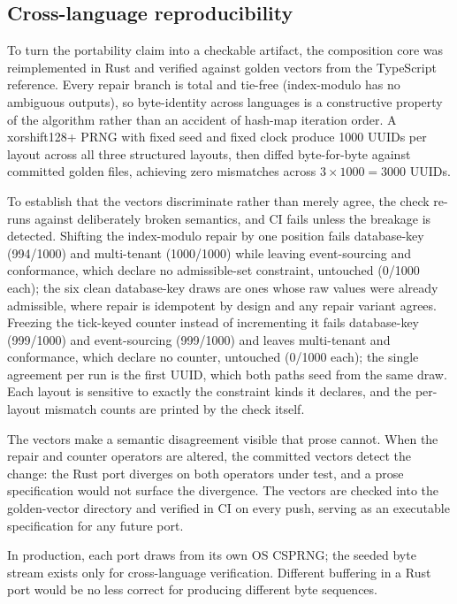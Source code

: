 \documentclass{svproc}
\begin{document}
\subsection{Cross-language reproducibility}
\label{sec:cross-lang}

To turn the portability claim into a checkable artifact, the composition core was reimplemented in Rust and verified against golden vectors from the TypeScript reference. Every repair branch is total and tie-free (index-modulo has no ambiguous outputs), so byte-identity across languages is a constructive property of the algorithm rather than an accident of hash-map iteration order. A xorshift128+ PRNG with fixed seed and fixed clock produce 1000 UUIDs per layout across all three structured layouts, then diffed byte-for-byte against committed golden files, achieving zero mismatches across $3\times1000=3000$ UUIDs.

To establish that the vectors discriminate rather than merely agree, the check re-runs against deliberately broken semantics, and CI fails unless the breakage is detected. Shifting the index-modulo repair by one position fails database-key (994/1000) and multi-tenant (1000/1000) while leaving event-sourcing and conformance, which declare no admissible-set constraint, untouched (0/1000 each); the six clean database-key draws are ones whose raw values were already admissible, where repair is idempotent by design and any repair variant agrees. Freezing the tick-keyed counter instead of incrementing it fails database-key (999/1000) and event-sourcing (999/1000) and leaves multi-tenant and conformance, which declare no counter, untouched (0/1000 each); the single agreement per run is the first UUID, which both paths seed from the same draw. Each layout is sensitive to exactly the constraint kinds it declares, and the per-layout mismatch counts are printed by the check itself.

The vectors make a semantic disagreement visible that prose cannot. When the
repair and counter operators are altered, the committed vectors detect the
change: the Rust port diverges on both operators under test, and a prose
specification would not surface the divergence. The vectors are checked into
the golden-vector directory and verified in CI on every push, serving as an executable
specification for any future port.

In production, each port draws from its own OS CSPRNG; the seeded byte stream exists only for cross-language verification. Different buffering in a Rust port would be no less correct for producing different byte sequences.
\end{document}
